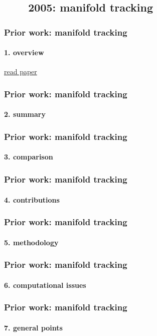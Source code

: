 \subsection{\ \ \ \ 2005: manifold tracking}

\begin{frame}
\frametitle{Prior work: manifold tracking}
\framesubtitle{1. overview}
\logoCSIPCPL\mypagenum
	{\color{blue}  \href{http://users.ece.gatech.edu/~msalman/papers/2005 JNL, Visual tracking and recognition using probabilistic appearance manifolds (Lee).pdf}{read paper}}
\end{frame}



\begin{frame}
\frametitle{Prior work: manifold tracking}
\framesubtitle{2. summary}
\logoCSIPCPL\mypagenum
{}
\end{frame}


\begin{frame}
\frametitle{Prior work: manifold tracking}
\framesubtitle{3. comparison}
\logoCSIPCPL\mypagenum		
{}
\end{frame}



\begin{frame}
\frametitle{Prior work: manifold tracking}
\framesubtitle{4. contributions}
\logoCSIPCPL\mypagenum
{}
\end{frame}


\begin{frame}
\frametitle{Prior work: manifold tracking}
\framesubtitle{5. methodology}
\logoCSIPCPL\mypagenum
{}
\end{frame}


\begin{frame}
\frametitle{Prior work: manifold tracking}
\framesubtitle{6. computational issues}
\logoCSIPCPL\mypagenum
{}
\end{frame}


\begin{frame}
\frametitle{Prior work: manifold tracking}
\framesubtitle{7. general points}
\logoCSIPCPL\mypagenum
{}
\end{frame}



